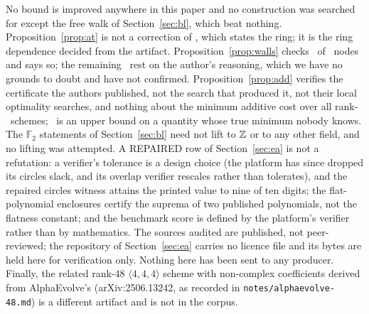 \documentclass[11pt]{article}
\newcommand{\F}{\mathbb{F}}
\newcommand{\mm}[3]{\langle #1,#2,#3\rangle}
\begin{document}
No bound is improved anywhere in this paper and no construction was searched for except the free walk of
Section~\ref{sec:bl}, which beat nothing. Proposition~\ref{prop:at} is not a correction of \cite{Fa22}, which
states the ring; it is the ring dependence decided from the artifact. Proposition~\ref{prop:walls} checks
\LBAttacked\ of \LBNodes\ nodes and says so; the remaining \LBNotAttacked\ rest on the author's reasoning,
which we have no grounds to doubt and have not confirmed. Proposition~\ref{prop:add} verifies the certificate
the authors published, not the search that produced it, not their local optimality searches, and nothing
about the minimum additive cost over all rank-\AddRank\ schemes; \AddCounted\ is an upper bound on a
quantity whose true minimum nobody knows. The $\F_2$ statements of Section~\ref{sec:bl} need not lift to $\mathbb{Z}$
or to any other field, and no lifting was attempted. A REPAIRED row of Section~\ref{sec:ea} is not a
refutation: a verifier's tolerance is a design choice (the platform has since dropped its circles slack, and
its overlap verifier rescales rather than tolerates), and the repaired circles witness attains the printed
value to nine of ten digits; the flat-polynomial enclosures certify the suprema of two published polynomials, not the
flatness constant; and the benchmark score is defined by the platform's verifier rather than by mathematics.
The sources audited are published, not peer-reviewed; the repository of Section~\ref{sec:ea} carries no
licence file and its bytes are held here for verification only. Nothing here has been sent to any producer.
Finally, the related rank-$48$ $\mm444$ scheme with non-complex coefficients derived from AlphaEvolve's
(arXiv:2506.13242, as recorded in \texttt{notes/alphaevolve-48.md}) is a different artifact and is not in
the corpus.
\end{document}
